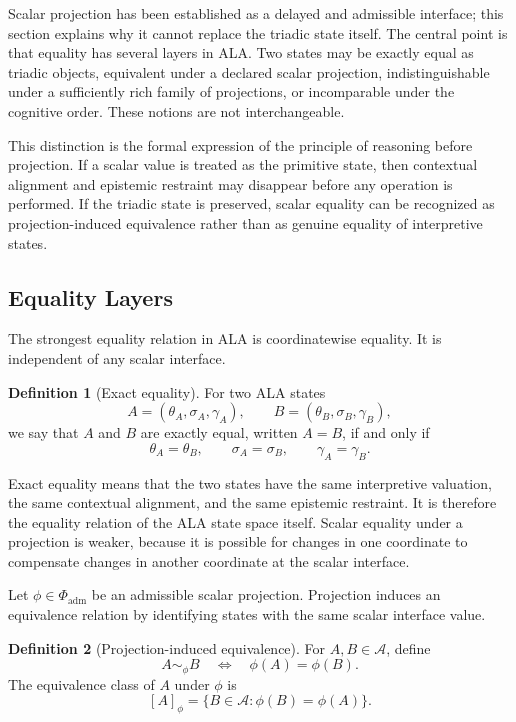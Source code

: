 \documentclass[reqno,final]{amsart}
\theoremstyle{definition}
\newtheorem{definition}{Definition}
\theoremstyle{plain}
\theoremstyle{remark}
\providecommand{\cA}{\mathcal{A}}
\providecommand{\cPhi}{\Phi}
\begin{document}
Scalar projection has been established as a delayed and admissible interface; this section explains why it cannot replace the triadic state itself. The central point is that equality has several layers in ALA. Two states may be exactly equal as triadic objects, equivalent under a declared scalar projection, indistinguishable under a sufficiently rich family of projections, or incomparable under the cognitive order. These notions are not interchangeable.

This distinction is the formal expression of the principle of reasoning before projection. If a scalar value is treated as the primitive state, then contextual alignment and epistemic restraint may disappear before any operation is performed. If the triadic state is preserved, scalar equality can be recognized as projection-induced equivalence rather than as genuine equality of interpretive states.

\subsection{Equality Layers}
The strongest equality relation in ALA is coordinatewise equality. It is independent of any scalar interface.

\begin{definition}[Exact equality]
For two ALA states
\[
A=(\theta_A,\sigma_A,\gamma_A),
\qquad
B=(\theta_B,\sigma_B,\gamma_B),
\]
we say that \(A\) and \(B\) are exactly equal, written \(A=B\), if and only if
\[
\theta_A=\theta_B,\qquad
\sigma_A=\sigma_B,\qquad
\gamma_A=\gamma_B.
\]
\end{definition}

Exact equality means that the two states have the same interpretive valuation, the same contextual alignment, and the same epistemic restraint. It is therefore the equality relation of the ALA state space itself. Scalar equality under a projection is weaker, because it is possible for changes in one coordinate to compensate changes in another coordinate at the scalar interface.

Let \(\phi\in\cPhi_{\mathrm{adm}}\) be an admissible scalar projection. Projection induces an equivalence relation by identifying states with the same scalar interface value.

\begin{definition}[Projection-induced equivalence]
\label{def:projection-equivalence}
For \(A,B\in\cA\), define
\[
A\sim_{\phi}B
\quad\Longleftrightarrow\quad
\phi(A)=\phi(B).
\]
The equivalence class of \(A\) under \(\phi\) is
\[
[A]_{\phi}=\{B\in\cA:\phi(B)=\phi(A)\}.
\]
\end{definition}
\end{document}
